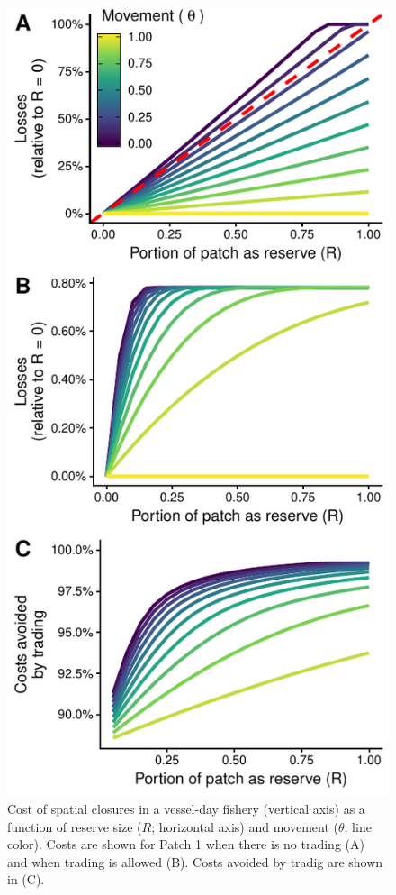\documentclass[12pt]{article}
\begin{document}
\begin{figure}[htbp]
\centering
\includegraphics{img/PNA_model.pdf}
\caption{\label{fig:PNA_model}Cost of spatial closures in a vessel-day fishery (vertical axis) as a function of reserve size ($R$; horizontal axis) and movement ($\theta$; line color). Costs are shown for Patch 1 when there is no trading (A) and when trading is allowed (B). Costs avoided by tradig are shown in (C).}
\end{figure}
\end{document}
